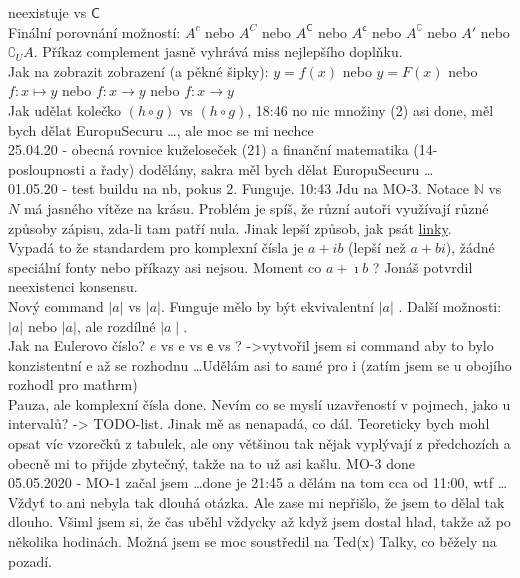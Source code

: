 \documentclass[12pt]{article}
\providecommand{\abs}[1]{\lvert#1\rvert}
\newcommand{\absb}[1]{\lvert#1\rvert}
\newcommand{\euler}{\mathrm{e}} %
\newcommand{\iu}{\mathrm{i}} %
\begin{document}
neexistuje vs $\mathsf{C}$\\
Finální porovnání možností: $A^c$ nebo $A^C$ nebo $A^\mathsf{C}$ nebo $A^\mathsf{c}$ nebo $A^\complement$ nebo $A'$ nebo $\complement_U A$. Příkaz complement jasně vyhrává miss nejlepšího doplňku.\\
Jak na zobrazit zobrazení (a pěkné šipky):  $y = f(x) $ nebo $ y = F(x) $ nebo $ f: x \mapsto y $ nebo $ f: x \to y $ nebo $ f: x \rightarrow y$ \\
Jak udělat kolečko $ (h ∘ g)$ vs $ (h \circ g)$, 18:46 no nic množiny (2) asi done, měl bych dělat EuropuSecuru \dots, ale moc se mi nechce\\
25.04.20 - obecná rovnice kuželoseček (21) a finanční matematika (14-posloupnosti a řady) dodělány, sakra měl bych dělat EuropuSecuru \dots \\
01.05.20 - test buildu na nb, pokus 2. Funguje. 10:43 Jdu na MO-3. Notace $\mathbb{N}$ vs $N$ má jasného vítěze na krásu. Problém je spíš, že různí autoři využívají různé způsoby zápisu, zda-li tam patří nula. Jinak lepší způsob, jak psát \href{https://www.latex-tutorial.com/tutorials/hyperlinks/}{linky}.\\
Vypadá to že standardem pro komplexní čísla je $a +ib$ (lepší než $a +bi$), žádné speciální fonty nebo příkazy asi nejsou. Moment co $a +\imath b$ ?  Jonáš potvrdil neexistenci konsensu.\\
Nový command $\abs{a}$ vs $\absb{a}$. Funguje mělo by být ekvivalentní $\lvert a \rvert$ . Další možnosti: $ \vert a \vert$ nebo $|a|$, ale rozdílné $ \mid a \mid$.\\
Jak na Eulerovo číslo? $e$ vs $\mathrm{e}$ vs $\mathsf{e}$ vs ? 	->vytvořil jsem si command aby to bylo konzistentní $\euler$ až se rozhodnu \dots Udělám asi to samé pro $\iu$ (zatím jsem se u obojího rozhodl pro mathrm)\\
Pauza, ale komplexní čísla done. Nevím co se myslí uzavřeností v pojmech, jako u intervalů? -> TODO-list. Jinak mě as nenapadá, co dál. Teoreticky bych mohl opsat víc vzorečků z tabulek, ale ony většinou tak nějak vyplývají z předchozích a obecně mi to přijde zbytečný, takže na to už asi kašlu. MO-3 done\\
05.05.2020 - MO-1 začal jsem \dots	done je 21:45 a dělám na tom cca od 11:00, wtf \dots  Vždyť to ani nebyla tak dlouhá otázka. Ale zase mi nepřišlo, že jsem to dělal tak dlouho. Všiml jsem si, že čas uběhl vždycky až když jsem dostal hlad, takže až po několika hodinách. Možná jsem  se moc soustředil na Ted(x) Talky, co běžely na pozadí.\\
\end{document}
